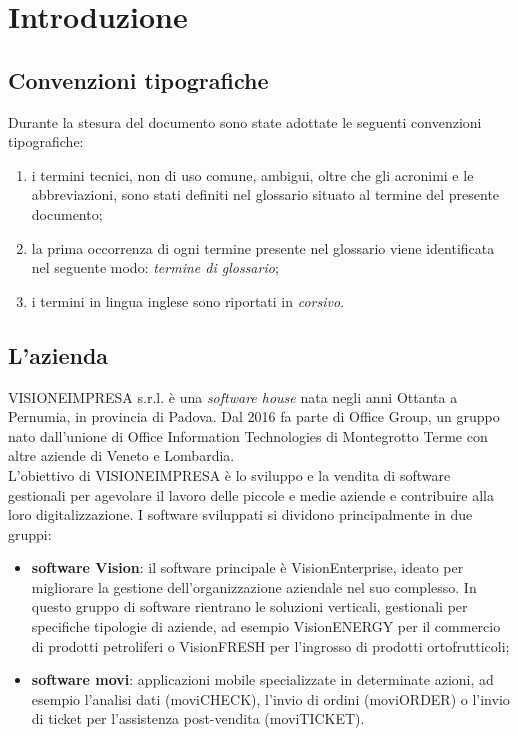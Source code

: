 \chapter{Introduzione}
\label{cap:introduzione}

\section{Convenzioni tipografiche}

Durante la stesura del documento sono state adottate le seguenti convenzioni tipografiche:
\begin{enumerate}
    \item i termini tecnici, non di uso comune, ambigui, oltre che gli acronimi e le abbreviazioni, sono stati definiti nel glossario situato al termine del presente documento;
    \item la prima occorrenza di ogni termine presente nel glossario viene identificata nel seguente modo: \emph{termine di glossario}\glsfirstoccur;
    \item i termini in lingua inglese sono riportati in \textit{corsivo}.
\end{enumerate}

\section{L'azienda}

VISIONEIMPRESA s.r.l. è una \textit{software house} nata negli anni Ottanta a Pernumia, in provincia di Padova. Dal 2016 fa parte di Office Group, un gruppo nato dall'unione di Office Information Technologies di Montegrotto Terme con altre aziende di Veneto e Lombardia.\\
L'obiettivo di VISIONEIMPRESA è lo sviluppo e la vendita di software gestionali per agevolare il lavoro delle piccole e medie aziende e contribuire alla loro digitalizzazione. I software sviluppati si dividono principalmente in due gruppi:
\begin{itemize}
    \item \textbf{software Vision}: il software principale è VisionEnterprise, ideato per migliorare la gestione dell'organizzazione aziendale nel suo complesso. In questo gruppo di software rientrano le soluzioni verticali, gestionali per specifiche tipologie di aziende, ad esempio VisionENERGY per il commercio di prodotti petroliferi o VisionFRESH per l'ingrosso di prodotti ortofrutticoli;
    \item \textbf{software movi}: applicazioni mobile specializzate in determinate azioni, ad esempio l'analisi dati (moviCHECK), l'invio di ordini (moviORDER) o l'invio di ticket per l'assistenza post-vendita (moviTICKET).
\end{itemize}

